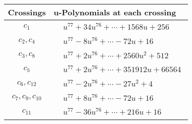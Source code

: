 \documentclass[1p]{elsarticle_modified}
\theoremstyle{definition}
\begin{document}
\begin{tabular}{m{50pt}|m{274pt}}
Crossings & \hspace{64pt}u-Polynomials at each crossing \\
\hline $$\begin{aligned}c_{1}\end{aligned}$$&$\begin{aligned}
&u^{77}+34 u^{76}+\cdots+1568 u+256
\end{aligned}$\\
\hline $$\begin{aligned}c_{2},c_{4}\end{aligned}$$&$\begin{aligned}
&u^{77}-8 u^{76}+\cdots-72 u+16
\end{aligned}$\\
\hline $$\begin{aligned}c_{3},c_{8}\end{aligned}$$&$\begin{aligned}
&u^{77}+2 u^{76}+\cdots+2560 u^2+512
\end{aligned}$\\
\hline $$\begin{aligned}c_{5}\end{aligned}$$&$\begin{aligned}
&u^{77}+2 u^{76}+\cdots+351912 u+66564
\end{aligned}$\\
\hline $$\begin{aligned}c_{6},c_{12}\end{aligned}$$&$\begin{aligned}
&u^{77}-2 u^{76}+\cdots-27 u^2+4
\end{aligned}$\\
\hline $$\begin{aligned}c_{7},c_{9},c_{10}\end{aligned}$$&$\begin{aligned}
&u^{77}+8 u^{76}+\cdots-72 u+16
\end{aligned}$\\
\hline $$\begin{aligned}c_{11}\end{aligned}$$&$\begin{aligned}
&u^{77}-36 u^{76}+\cdots+216 u+16
\end{aligned}$\\
\hline
\end{tabular}\\~\\
\newpage\renewcommand{\arraystretch}{1}
\end{document}
